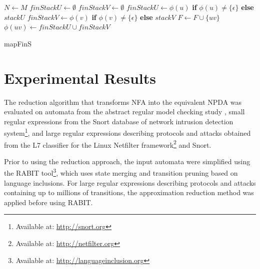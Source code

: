             \begin{algorithm}
                \footnotesize
                \DontPrintSemicolon
                \setcounter{AlgoLine}{0}

                $N \leftarrow M$\;
                {
                    $finStackU \leftarrow \emptyset$\;
                    $finStackV \leftarrow \emptyset$\;
                    {
                        $finStackU \leftarrow \phi(u)$ \textbf{if} $\phi(u) \neq \{\epsilon\}$ \textbf{else} $stackU$\;
                    }
                    {
                        $finStackV \leftarrow \phi(v)$ \textbf{if} $\phi(v) \neq \{\epsilon\}$ \textbf{else} $stackV$\;
                    }
                    {
                        $F \leftarrow F \cup \{uv\}$
                        $\phi(uv) \leftarrow finStackU \cup finStackV$\;
                    }
                }

                \normalsize
                \caption{mapFinS}
            \end{algorithm}


\section{Experimental Results}
    The reduction algorithm that transforms NFA into the equivalent NPDA was evaluated on automata from the abstract regular model checking study \cite{ARMC}, small regular expressions from the Snort database of network intrusion detection system\footnote{Available at: \url{http://snort.org}}, and large regular expressions describing protocols and attacks obtained from the L7 classifier for the Linux Netfilter framework\footnote{Available at: \url{http://netfilter.org}} and Snort.

    Prior to using the reduction approach, the input automata were simplified using the RABIT tool\footnote{Available at: \url{http://languageinclusion.org}}, which uses state merging and transition pruning based on language inclusions. For large regular expressions describing protocols and attacks containing up to millions of transitions, the approximation reduction method \cite{ApproxRed} was applied before using RABIT.

